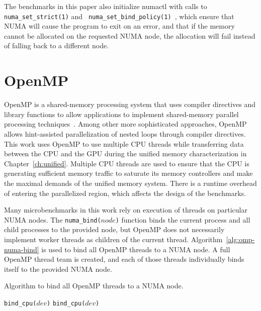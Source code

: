 The benchmarks in this paper also initialize numactl with calls to \texttt{numa\_set\_strict(1)} and \texttt{ numa\_set\_bind\_policy(1) }, which ensure that NUMA will cause the program to exit on an error, and that if the memory cannot be allocated on the requested NUMA node, the allocation will fail instead of falling back to a different node.

\section{OpenMP}
\label{sec:openmp}

OpenMP is a shared-memory processing system that uses compiler directives and library functions to allow applications to implement shared-memory parallel processing techniques~\cite{openmp2013}.
Among other more sophisticated approaches, OpenMP allows hint-assisted parallelization of nested loops through compiler directives.
This work uses OpenMP to use multiple CPU threads while transferring data between the CPU and the GPU during the unified memory characterization in Chapter~\ref{ch:unified}. 
Multiple CPU threads are used to ensure that the CPU is generating sufficient memory traffic to saturate its memory controllers and make the maximal demands of the unified memory system.
There is a runtime overhead of entering the parallelized region, which affects the design of the benchmarks.

Many microbenchmarks in this work rely on execution of threads on particular NUMA nodes.
The \texttt{numa\_bind($node$)} function binds the current process and all child processes to the provided node, but OpenMP does not necessarily implement worker threads as children of the current thread.
Algorithm~\ref{alg:omp-numa-bind} is used to bind all OpenMP threads to a NUMA node.
A full OpenMP thread team is created, and each of those threads individually binds itself to the provided NUMA node.

\begin{algorithm}
	\caption[Bind OpenMP threads to a NUMA node]{
		Algorithm to bind all OpenMP threads to a NUMA node.
	}
	\label{alg:omp-numa-bind}
	\begin{algorithmic}[1]
		\Statex
        \State \texttt{bind\_cpu($dev$)}
        \State \texttt{bind\_cpu($dev$)}
        \EndFor
        \EndFunction
		
	\end{algorithmic}
\end{algorithm}

